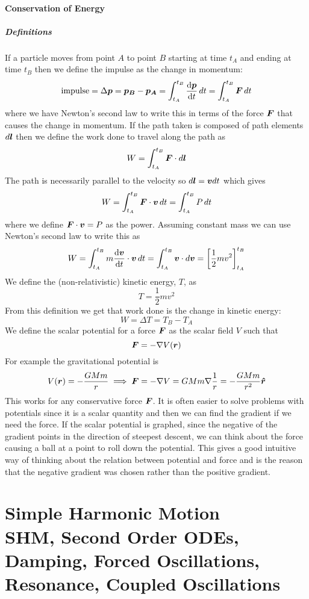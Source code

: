 \documentclass{article}
\begin{document}
    \subsection{Conservation of Energy}
    \subsubsection{Definitions}
    If a particle moves from point \(A\) to point \(B\) starting at time \(t_A\) and ending at time \(t_B\) then we define the impulse as the change in momentum:
    \[\text{impulse} = \Delta\bm{p} = \bm{p_B} - \bm{p_A} = \int_{t_A}^{t_B}\dv{\bm{p}}{t}\,dt = \int_{t_A}^{t_B}\bm{F}\,dt\]
    where we have Newton's second law to write this in terms of the force \(\bm{F}\) that causes the change in momentum.
    If the path taken is composed of path elements \(d\bm{l}\) then we define the work done to travel along the path as
    \[W = \int_{t_A}^{t_B}\bm{F}\cdot d\bm{l}\]
    The path is necessarily parallel to the velocity so \(d\bm{l} = \bm{v}dt\) which gives
    \[W = \int_{t_A}^{t_B}\bm{F}\cdot\bm{v}\,dt = \int_{t_A}^{t_B}P\,dt\]
    where we define \(\bm{F}\cdot\bm{v} = P\) as the power.
    Assuming constant mass we can use Newton's second law to write this as
    \[W = \int_{t_A}^{t_B} m\dv{\bm{v}}{t}\cdot\bm{v}\, dt = \int_{t_A}^{t_B}\bm{v}\cdot d\bm{v} = \left[\frac{1}{2}mv^2\right]_{t_A}^{t_B}\]
    We define the (non-relativistic) kinetic energy, \(T\), as
    \[T = \frac{1}{2}mv^2\]
    From this definition we get that work done is the change in kinetic energy:
    \[W = \Delta T = T_B - T_A\]
    We define the scalar potential for a force \(\bm{F}\) as the scalar field \(V\) such that 
    \[\bm{F} = -\nabla V(\bm{r})\]
    For example the gravitational potential is
    \[V(\bm{r}) = -\frac{GMm}{r}\implies \bm{F} = -\nabla V = GMm\nabla\frac{1}{r} = -\frac{GMm}{r^2}\bm{\hat{r}}\]
    This works for any conservative force \(\bm{F}\).
    It is often easier to solve problems with potentials since it is a scalar quantity and then we can find the gradient if we need the force.
    If the scalar potential is graphed, since the negative of the gradient points in the direction of steepest descent, we can think about the force causing a ball at a point to roll down the potential.
    This gives a good intuitive way of thinking about the relation between potential and force and is the reason that the negative gradient was chosen rather than the positive gradient.
    
    \part[Simple Harmonic Motion]{Simple Harmonic Motion\\[\bigskipamount]\large SHM, Second Order ODEs, Damping, Forced Oscillations, Resonance, Coupled Oscillations}
\end{document}
